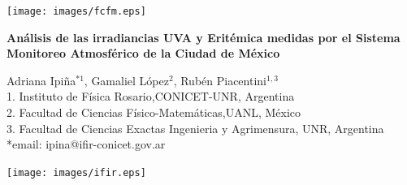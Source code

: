 \documentclass{article}
\begin{document}
\vspace*{-2cm}
\changefontsizes{14pt}
\hspace*{-1cm}
\begin{minipage}{0.2\linewidth}
\vspace{-0.3cm}
\texttt{[image: images/fcfm.eps]}
\end{minipage}
\vspace*{-0.4cm}
\begin{minipage}{0.65\linewidth}
\vspace*{0.7cm}
\begin{center}
\changefontsizes{15pt}
\hspace*{-0.1cm}
\textbf{\textcolor{bl}{Análisis de las irradiancias UVA y Eritémica medidas por el Sistema Monitoreo Atmosférico de la Ciudad de México}}
\end{center}
\vspace{-1cm}
\begin{center}
\changefontsizes{11pt}
Adriana Ipiña$^{*1}$, Gamaliel López$^{2}$, Rubén Piacentini$^{1,3}$\\
1. Instituto de Física Rosario,CONICET-UNR, Argentina\\
2. Facultad de Ciencias Físico-Matemáticas,UANL, México\\
3. Facultad de Ciencias Exactas Ingenieria y Agrimensura, UNR, Argentina\\ *email: ipina@ifir-conicet.gov.ar
\end{center}
\end{minipage}
\begin{minipage}{0.2\linewidth}
\hspace*{0.2cm}
\texttt{[image: images/ifir.eps]}
\end{minipage}\vspace{0.5cm}\\
\changefontsizes{12pt}
\end{document}
